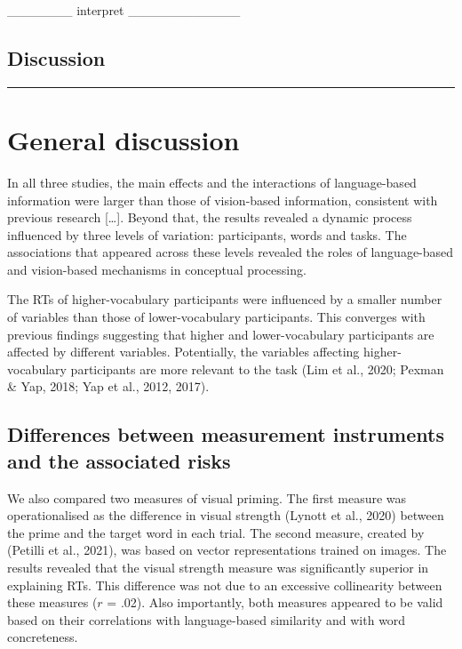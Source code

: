 \documentclass[
  12pt,
  man,floatsintext]{apa7}
\begin{document}
\_\_\_\_\_\_\_ interpret \_\_\_\_\_\_\_\_\_\_\_\_

\hypertarget{discussion-2}{%
\subsection{Discussion}\label{discussion-2}}

\begin{center}\rule{0.5\linewidth}{0.5pt}\end{center}

\hypertarget{general-discussion}{%
\section{General discussion}\label{general-discussion}}

In all three studies, the main effects and the interactions of language-based information were larger than those of vision-based information, consistent with previous research {[}\ldots{]}. Beyond that, the results revealed a dynamic process influenced by three levels of variation: participants, words and tasks. The associations that appeared across these levels revealed the roles of language-based and vision-based mechanisms in conceptual processing.

The RTs of higher-vocabulary participants were influenced by a smaller number of variables than those of lower-vocabulary participants. This converges with previous findings suggesting that higher and lower-vocabulary participants are affected by different variables. Potentially, the variables affecting higher-vocabulary participants are more relevant to the task (Lim et al., 2020; Pexman \& Yap, 2018; Yap et al., 2012, 2017).

\hypertarget{differences-between-measurement-instruments-and-the-associated-risks}{%
\subsection{Differences between measurement instruments and the associated risks}\label{differences-between-measurement-instruments-and-the-associated-risks}}

We also compared two measures of visual priming. The first measure was operationalised as the difference in visual strength (Lynott et al., 2020) between the prime and the target word in each trial. The second measure, created by (Petilli et al., 2021), was based on vector representations trained on images. The results revealed that the visual strength measure was significantly superior in explaining RTs. This difference was not due to an excessive collinearity between these measures (\(r\) = .02). Also importantly, both measures appeared to be valid based on their correlations with language-based similarity and with word concreteness.
\end{document}
